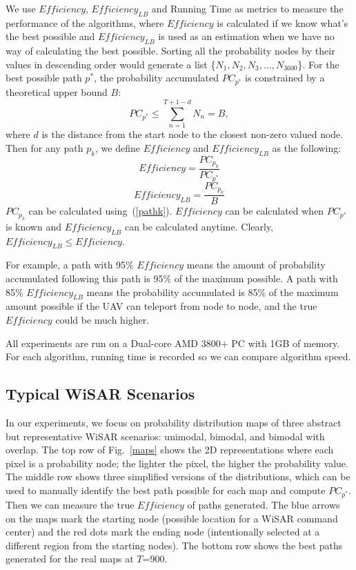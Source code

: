 We use $\mathit{Efficiency}$, $\mathit{Efficiency_{LB}}$ and Running Time as metrics to measure the performance of the algorithms, where $\mathit{Efficiency}$ is calculated if we know what's the best possible and $\mathit{Efficiency_{LB}}$ is used as an estimation when we have no way of calculating the best possible. Sorting all the probability nodes by their values in descending order would generate a list \{$N_1, N_2, N_3, ..., N_{3600}$\}. For the best possible path $p^*$, the probability accumulated $PC_{p^*}$ is constrained by a theoretical upper bound $B$:
\begin{equation}
PC_{p^*} \leq \sum_{n=1}^{T+1-d}N_n = B,
\label{topN}
\end{equation}
where $d$ is the distance from the start node to the closest non-zero valued node. Then for any path $p_k$, we define $\mathit{Efficiency}$ and $\mathit{Efficiency_{LB}}$ as the following:
\begin{equation}
\mathit{Efficiency} = \frac{PC_{p_k}}{PC_{p^*}}
\label{4Efficiency}
\end{equation}
\begin{equation}
\mathit{Efficiency_{LB}} = \frac{PC_{p_k}}{B}
\label{4EfficiencyLB}
\end{equation}
$PC_{p_k}$ can be calculated using~(\ref{pathk}). $\mathit{Efficiency}$ can be calculated when $PC_{p^*}$ is known and $\mathit{Efficiency_{LB}}$ can be calculated anytime. Clearly, $\mathit{Efficiency_{LB}} \leq \mathit{Efficiency}$.

For example, a path with 95\% $\mathit{Efficiency}$ means the amount of probability accumulated following this path is 95\% of the maximum possible. A path with 85\% $\mathit{Efficiency_{LB}}$ means the probability accumulated is 85\% of the maximum amount possible if the UAV can teleport from node to node, and the true $\mathit{Efficiency}$ could be much higher.

All experiments are run on a Dual-core AMD 3800+ PC with 1GB of memory. For each algorithm, running time is recorded so we can compare algorithm speed.


\subsection{Typical WiSAR Scenarios}

In our experiments, we focus on probability distribution maps of three abstract but representative WiSAR scenarios: unimodal, bimodal, and bimodal with overlap. The top row of Fig.~\ref{maps} shows the 2D representations where each pixel is a probability node; the lighter the pixel, the higher the probability value. The middle row shows three simplified versions of the distributions, which can be used to manually identify the best path possible for each map and compute $PC_{p^*}$. Then we can measure the true $\mathit{Efficiency}$ of paths generated. The blue arrows on the maps mark the starting node (possible location for a WiSAR command center) and the red dots mark the ending node (intentionally selected at a different region from the starting nodes). The bottom row shows the best paths generated for the real maps at $T$=900.


